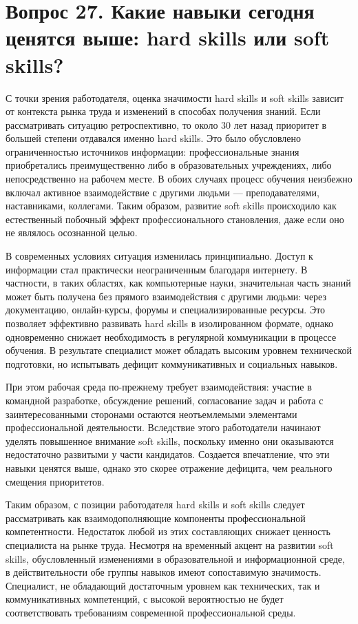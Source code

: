 \documentclass[14pt,a4paper]{extarticle}
\begin{document}
\section{Вопрос 27. Какие навыки сегодня ценятся выше: hard skills или soft skills?}

С точки зрения работодателя, оценка значимости hard skills и soft skills зависит от контекста рынка труда и изменений в способах получения знаний. Если рассматривать ситуацию ретроспективно, то около 30 лет назад приоритет в большей степени отдавался именно hard skills. Это было обусловлено ограниченностью источников информации: профессиональные знания приобретались преимущественно либо в образовательных учреждениях, либо непосредственно на рабочем месте. В обоих случаях процесс обучения неизбежно включал активное взаимодействие с другими людьми — преподавателями, наставниками, коллегами. Таким образом, развитие soft skills происходило как естественный побочный эффект профессионального становления, даже если оно не являлось осознанной целью.

В современных условиях ситуация изменилась принципиально. Доступ к информации стал практически неограниченным благодаря интернету. В частности, в таких областях, как компьютерные науки, значительная часть знаний может быть получена без прямого взаимодействия с другими людьми: через документацию, онлайн-курсы, форумы и специализированные ресурсы. Это позволяет эффективно развивать hard skills в изолированном формате, однако одновременно снижает необходимость в регулярной коммуникации в процессе обучения. В результате специалист может обладать высоким уровнем технической подготовки, но испытывать дефицит коммуникативных и социальных навыков.

При этом рабочая среда по-прежнему требует взаимодействия: участие в командной разработке, обсуждение решений, согласование задач и работа с заинтересованными сторонами остаются неотъемлемыми элементами профессиональной деятельности. Вследствие этого работодатели начинают уделять повышенное внимание soft skills, поскольку именно они оказываются недостаточно развитыми у части кандидатов. Создается впечатление, что эти навыки ценятся выше, однако это скорее отражение дефицита, чем реального смещения приоритетов.

Таким образом, с позиции работодателя hard skills и soft skills следует рассматривать как взаимодополняющие компоненты профессиональной компетентности. Недостаток любой из этих составляющих снижает ценность специалиста на рынке труда. Несмотря на временный акцент на развитии soft skills, обусловленный изменениями в образовательной и информационной среде, в действительности обе группы навыков имеют сопоставимую значимость. Специалист, не обладающий достаточным уровнем как технических, так и коммуникативных компетенций, с высокой вероятностью не будет соответствовать требованиям современной профессиональной среды.
\end{document}
